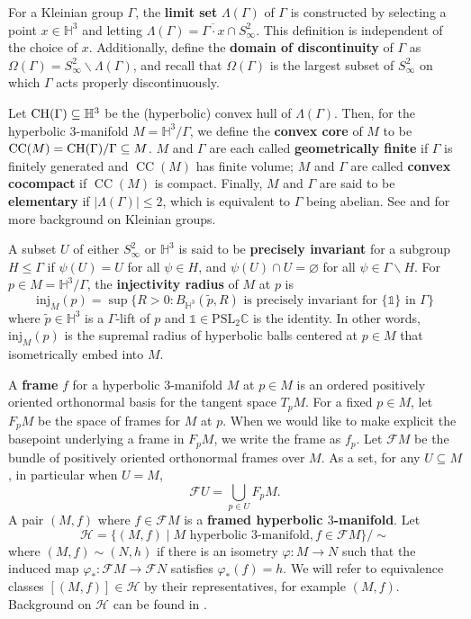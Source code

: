 \documentclass[11pt,leqno]{article}
\DeclareMathOperator{\CC}{CC}
\theoremstyle{introdef}
\numberwithin{lemma}{section}
\theoremstyle{definition}
\newcommand{\C}{\mathbb{C}}
\begin{document}
For a Kleinian group $\Gamma$, the \textbf{limit set} $\Lambda(\Gamma)$ of $\Gamma$ is constructed by selecting a point $x\in\mathbb{H}^3$ and letting $\Lambda(\Gamma)=\overline{\Gamma \cdot x}\cap S^2_\infty$. This definition is independent of the choice of $x$. Additionally, define the \textbf{domain of discontinuity} of $\Gamma$ as $\Omega(\Gamma)=S^2_\infty\backslash\Lambda(\Gamma)$, and  recall that $\Omega(\Gamma)$ is the largest subset of $S^2_\infty$ on which $\Gamma$ acts properly discontinuously.\par


Let $\mathrm{CH}(\Gamma)\subseteq\mathbb{H}^3$ be the (hyperbolic) convex hull of $\Lambda(\Gamma)$. Then, for the hyperbolic $3$-manifold $M=\mathbb{H}^3/\Gamma$, we define the \textbf{convex core} of $M$ to be $\CC(M)=\CH(\Gamma)/\Gamma\subseteq M$. $M$ and $\Gamma$ are each called \textbf{geometrically finite} if $\Gamma$ is finitely generated and $\CC(M)$ has finite volume; $M$ and $\Gamma$ are called \textbf{convex cocompact} if $\CC(M)$ is compact. Finally, $M$ and $\Gamma$ are said to be \textbf{elementary} if $|\Lambda(\Gamma)|\leq 2$, which is equivalent to $\Gamma$ being abelian. See \cite{NOTE} and \cite{MAT} for more background on Kleinian groups.\par

A subset $U$ of either $S^2_\infty$ or $\mathbb{H}^3$ is said to be \textbf{precisely invariant} for a subgroup $H\leq\Gamma$ if $\psi(U)=U$ for all $\psi\in H$, and $\psi(U)\cap U=\varnothing$ for all $\psi\in\Gamma\backslash H$. For $p\in M=\mathbb{H}^3/\Gamma$, the \textbf{injectivity radius} of $M$ at $p$ is \[\mathrm{inj}_M(p) = \sup\{R>0 : B_{\mathbb{H}^3}(\tilde{p},R)\text{ is precisely invariant for }\{\mathds{1}\}\text{ in }\Gamma\}\] where $\tilde{p}\in\mathbb{H}^3$ is a $\Gamma$-lift of $p$ and $\mathds{1}\in\mathrm{PSL}_2\C$ is the identity. In other words, $\mathrm{inj}_M(p)$ is the supremal radius of hyperbolic balls centered at $p\in M$ that isometrically embed into $M$. \par

A \textbf{frame} $f$ for a hyperbolic $3$-manifold $M$ at $p\in M$ is an ordered positively oriented orthonormal basis for  the tangent space $T_pM$. For a fixed $p\in M$, let $F_pM$ be the space of frames for $M$ at $p$. When we would like to make explicit the basepoint underlying a frame in $F_pM$, we write the frame as $f_p$. Let $\mathcal{F}M$ be the bundle of positively oriented orthonormal frames over $M$. As a set, for any $U\subseteq M$, in particular when $U=M$, \[\mathcal{F}U = \bigcup_{p\in U}F_pM.\] A pair $(M,f)$ where $f\in\mathcal{F}M$ is a \textbf{framed hyperbolic $3$-manifold}. Let \[\mathcal{H}=\{(M,f)\;|\; M \text{ hyperbolic }3\text{-manifold}, f\in \mathcal{F}M\}/\sim\] where $(M,f)\sim (N,h)$ if there is an isometry $\varphi:M\rightarrow N$ such that the induced map $\varphi_*:\mathcal{F}M\rightarrow\mathcal{F}N$ satisfies $\varphi_*(f)=h$. We will refer to equivalence classes $[(M,f)]\in \mathcal{H}$ by their representatives, for example $(M,f)$. Background on $\mathcal{H}$ can be found in \cite{BEN}.\par
\end{document}
